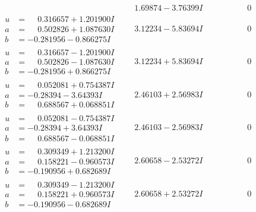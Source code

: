 \documentclass[1p]{elsarticle_modified}
\theoremstyle{definition}
\begin{document}
$$\begin{array}{c|c|c}
 & \phantom{-}1.69874 - 3.76399 I & \phantom{-0.000000 } 0 \\ \hline\begin{aligned}
u &= \phantom{-}0.316657 + 1.201900 I \\
a &= \phantom{-}0.502826 + 1.087630 I \\
b &= -0.281956 - 0.866275 I\end{aligned}
 & \phantom{-}3.12234 - 5.83694 I & \phantom{-0.000000 } 0 \\ \hline\begin{aligned}
u &= \phantom{-}0.316657 - 1.201900 I \\
a &= \phantom{-}0.502826 - 1.087630 I \\
b &= -0.281956 + 0.866275 I\end{aligned}
 & \phantom{-}3.12234 + 5.83694 I & \phantom{-0.000000 } 0 \\ \hline\begin{aligned}
u &= \phantom{-}0.052081 + 0.754387 I \\
a &= -0.28394 - 3.64393 I \\
b &= \phantom{-}0.688567 + 0.068851 I\end{aligned}
 & \phantom{-}2.46103 + 2.56983 I & \phantom{-0.000000 } 0 \\ \hline\begin{aligned}
u &= \phantom{-}0.052081 - 0.754387 I \\
a &= -0.28394 + 3.64393 I \\
b &= \phantom{-}0.688567 - 0.068851 I\end{aligned}
 & \phantom{-}2.46103 - 2.56983 I & \phantom{-0.000000 } 0 \\ \hline\begin{aligned}
u &= \phantom{-}0.309349 + 1.213200 I \\
a &= \phantom{-}0.158221 - 0.960573 I \\
b &= -0.190956 + 0.682689 I\end{aligned}
 & \phantom{-}2.60658 - 2.53272 I & \phantom{-0.000000 } 0 \\ \hline\begin{aligned}
u &= \phantom{-}0.309349 - 1.213200 I \\
a &= \phantom{-}0.158221 + 0.960573 I \\
b &= -0.190956 - 0.682689 I\end{aligned}
 & \phantom{-}2.60658 + 2.53272 I & \phantom{-0.000000 } 0 \\ \hline\begin{aligned}

\end{aligned}
\end{array}$$
\end{document}
